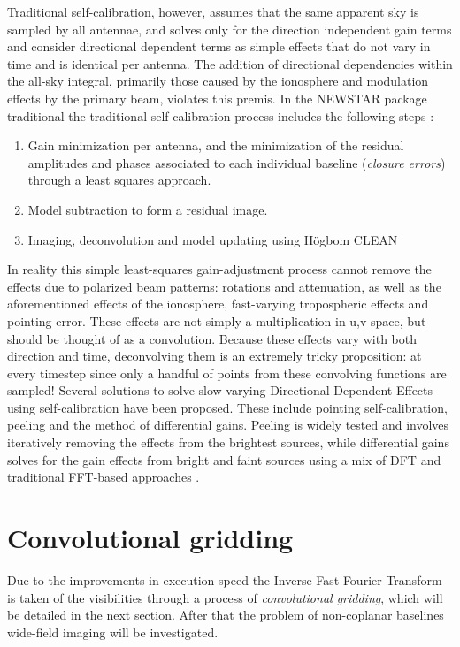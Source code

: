 \documentclass[a4paper,10pt]{report}
\begin{document}
 Traditional self-calibration, however, assumes that the same apparent sky is sampled by all antennae, and solves only for the direction independent gain terms and consider directional dependent terms as simple effects that 
 do not vary in time and is identical per antenna. The addition of directional dependencies within the all-sky integral, primarily those caused by the ionosphere and modulation effects by the primary beam, violates this premis. In 
 the NEWSTAR package traditional the traditional self calibration process includes the following steps \cite{2011A&A...527A.107S}:
 \begin{enumerate}
  \item Gain minimization per antenna, and the minimization of the residual amplitudes and phases associated to each individual baseline (\textit{closure errors}) through a least squares approach.
  \item Model subtraction to form a residual image.
  \item Imaging, deconvolution and model updating using H\"ogbom CLEAN
 \end{enumerate}
 
 In reality this simple least-squares gain-adjustment process cannot remove the effects due to polarized beam patterns: rotations and attenuation, as well as the aforementioned effects of the ionosphere, fast-varying tropospheric
 effects and pointing error. These effects are not simply a multiplication in u,v space, but should be thought of as a convolution. Because these effects vary with both direction and time, deconvolving them is an extremely tricky proposition: 
 at every timestep since only a handful of points from these convolving functions are sampled! Several solutions to solve slow-varying Directional Dependent Effects using self-calibration have been proposed. These include pointing self-calibration,
 peeling and the method of differential gains. Peeling is widely tested and involves iteratively removing the effects from the brightest sources, while differential gains solves for the gain effects from bright and faint sources using a mix of
 DFT and traditional FFT-based approaches \cite{2011A&A...527A.107S,2011A&A...527A.108S}.
 
 \section{Convolutional gridding}
 
Due to the improvements in execution speed the Inverse Fast Fourier Transform is taken of the visibilities through a process of \textit{convolutional gridding}, which will be detailed in the next section. After that the problem 
of non-coplanar baselines wide-field imaging will be investigated. 



\end{document}
